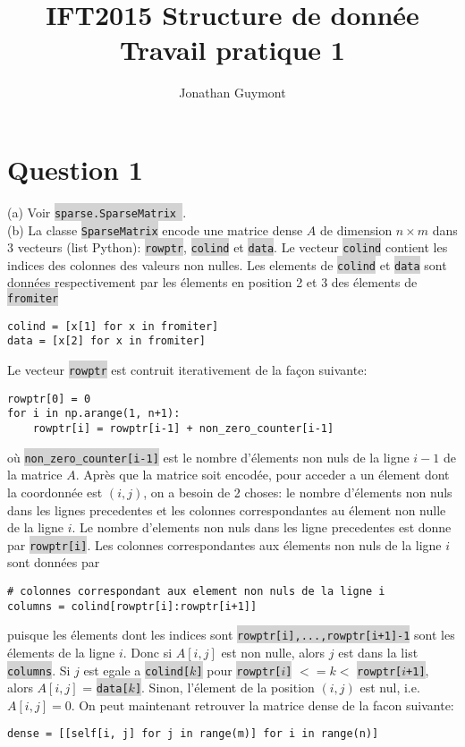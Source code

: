 \documentclass[10pt]{article}
\title{IFT2015 Structure de donnée\\Travail pratique 1}
\author{Jonathan Guymont}
\newcommand{\code}[1]{{\small\colorbox{LightGray}{\texttt{#1}}}}
\begin{document}
\maketitle

\section*{Question 1}
(a) Voir \code{sparse.SparseMatrix }.\\

(b) La classe \code{SparseMatrix} encode une matrice dense $A$ de dimension $n\times m$ dans 3 vecteurs (list Python): \code{rowptr}, \code{colind} et \code{data}. Le vecteur \code{colind} contient les indices des colonnes des valeurs non nulles. Les elements de \code{colind} et \code{data} sont données respectivement par les élements en position 2 et 3 des élements de \code{fromiter}
\begin{verbatim}
colind = [x[1] for x in fromiter]
data = [x[2] for x in fromiter]
\end{verbatim}
Le vecteur \code{rowptr} est contruit iterativement de la façon suivante:
\begin{verbatim}
rowptr[0] = 0
for i in np.arange(1, n+1):
    rowptr[i] = rowptr[i-1] + non_zero_counter[i-1]
\end{verbatim}
où \code{non\_zero\_counter[i-1]} est le nombre d'élements non nuls de la ligne $i-1$ de la matrice $A$. Après que la matrice soit encodée, pour acceder a un élement dont la coordonnée est $(i, j)$, on a besoin de 2 choses: le nombre d'élements non nuls dans les lignes precedentes et les colonnes correspondantes au élement non nulle de la ligne $i$. Le nombre d'elements non nuls dans les ligne precedentes est donne par \code{rowptr[i]}. Les colonnes correspondantes aux élements non nuls de la ligne $i$ sont données par 
\begin{verbatim}
# colonnes correspondant aux element non nuls de la ligne i
columns = colind[rowptr[i]:rowptr[i+1]]
\end{verbatim}
puisque les élements dont les indices sont \code{rowptr[i],...,rowptr[i+1]-1} sont les élements de la ligne $i$. Donc si $A[i, j]$ est non nulle, alors $j$ est dans la list \code{columns}. Si $j$ est egale a \code{colind[$k$]} pour \code{rowptr[$i$]} $<= k <$ \code{rowptr[$i$+1]}, alors $A[i,j]$ = \code{data[$k$]}. Sinon, l'élement de la position $(i,j)$ est nul, i.e. $A[i,j] = 0$. On peut maintenant retrouver la matrice dense de la facon suivante:
\begin{verbatim}
dense = [[self[i, j] for j in range(m)] for i in range(n)]
\end{verbatim}
\end{document}
